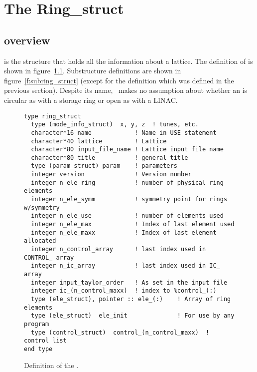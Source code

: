 \chapter{The Ring\_struct}
\section{overview}

 is the structure that holds all the information 
about a lattice.  The definition of  is shown in
figure~\ref{f:ring_struct}.  Substructure definitions are shown in
figure~\ref{f:subring_struct} (except for the  definition
which was defined in the previous section). Despite its name, \bmad\
makes no assumption about whether an  is circular as
with a storage ring or open as with a LINAC.

\begin{figure}[tb]
\centering
\begin{verbatim}
type ring_struct
  type (mode_info_struct)  x, y, z  ! tunes, etc.
  character*16 name            ! Name in USE statement
  character*40 lattice         ! Lattice
  character*80 input_file_name ! Lattice input file name
  character*80 title           ! general title
  type (param_struct) param    ! parameters
  integer version              ! Version number
  integer n_ele_ring           ! number of physical ring elements
  integer n_ele_symm           ! symmetry point for rings w/symmetry
  integer n_ele_use            ! number of elements used
  integer n_ele_max            ! Index of last element used
  integer n_ele_maxx           ! Index of last element allocated
  integer n_control_array      ! last index used in CONTROL_ array
  integer n_ic_array           ! last index used in IC_ array
  integer input_taylor_order   ! As set in the input file
  integer ic_(n_control_maxx)  ! index to %control_(:)
  type (ele_struct), pointer :: ele_(:)    ! Array of ring elements
  type (ele_struct)  ele_init              ! For use by any program
  type (control_struct)  control_(n_control_maxx)  ! control list
end type
\end{verbatim}
\caption{Definition of the .}
\label{f:ring_struct}
\end{figure}

